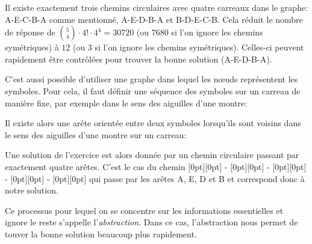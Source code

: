 {{Il existe exactement trois chemins circulaires avec quatre carreaux dans le graphe: A-E-C-B-A comme mentionné, A-E-D-B-A et B-D-E-C-B. Cela réduit le nombre de réponse de ${{5 \choose 4}  \cdot 4! \cdot 4 ^ 4 = 30720}$ (ou ${7680}$ si l’on ignore les chemins symétriques) à ${12}$ (ou ${3}$ si l’on ignore les chemins symétriques). Celles-ci peuvent rapidement être contrôlées pour trouver la bonne solution (A-E-D-B-A).

C’est aussi possible d’utiliser une graphe dans lequel les nœuds représentent les symboles. Pour cela, il faut définir une séquence des symboles sur un carreau de manière fixe, par exemple dans le sens des aiguilles d’une montre:

{\centering%
\par}

Il existe alors une arête orientée entre deux symboles lorsqu’ils sont voisins dans le sens des aiguilles d’une montre sur un carreau:

{\centering%
\par}

Une solution de l’exercice est alors donnée par un chemin circulaire passant par exactement quatre arêtes. C’est le cas du chemin \raisebox{\dimexpr -0.5ex +0.4ex \relax}[0pt][0pt]{} - \raisebox{\dimexpr -0.5ex +0.4ex \relax}[0pt][0pt]{} - \raisebox{\dimexpr -0.5ex +0.4ex \relax}[0pt][0pt]{} - \raisebox{-0.5ex}[0pt][0pt]{} - \raisebox{\dimexpr -0.5ex +0.4ex \relax}[0pt][0pt]{} qui passe par les arêtes A, E, D et B et correspond donc à notre solution.

Ce processus pour lequel on se concentre sur les informations essentielles et ignore le reste s’appelle l’\emph{abstraction}. Dans ce cas, l’abstraction nous permet de touver la bonne solution beaucoup plus rapidement.



}}
